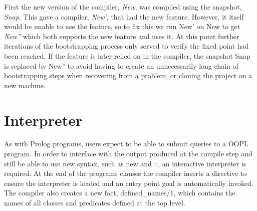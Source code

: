 \documentclass[12pt,a4paper,twoside,openright]{report}
\newcommand{\tblocktextnm}[4]{
    {#1} \& {#4}   \& {#2} \\
    {}     \&  {#3}   \&      \\
}
\newcommand{\tblockoutline}[1]{
    \draw (#1-1-1.south west) |- (#1-1-3.north east) |- (#1-1-3.south west) |- (#1-2-2.south west) |- (#1-1-1.south west);
}
\newcommand{\wblocktext}[1]{
    {#1} \\
    {}\\
}
\newcommand{\wblockoutline}[1]{
    \draw (#1-1-1.south west) |- (#1-1-1.north east) -- (#1-1-1.south east) -- (#1-2-1.south) -- (#1-1-1.south west);
}
\newcommand{\wsupt}[2]{
	\node(mac#2) at (#2-2-2.south west) [wblock, anchor = mac#2-1-1.north west] {\wblocktext{#1}};
	\wblockoutline{mac#2};
}
\begin{document}
\begin{center}
\end{center}

First the new version of the compiler, \emph{New}, was compiled using the snapshot, \emph{Snap}. This gave a compiler, \emph{New'}, that had the new feature. However, it itself would be unable to use the feature, so to fix this we run New' on New to get \emph{New''} which both supports the new feature and uses it. At this point further iterations of the bootstrapping process only served to verify the fixed point had been reached. If the feature is later relied on in the compiler, the snapshot Snap is replaced by New'' to avoid having to create an unnecessarily long chain of bootstrapping steps when recovering from a problem, or cloning the project on a new machine.

\section{Interpreter}

As with Prolog programs, users expect to be able to submit queries to a OOPL program. In order to interface with the output produced at the compile step and still be able to use new syntax, such as new and ::, an interactive interpreter is required. At the end of the programs clauses the compiler inserts a directive to ensure the interpreter is loaded and an entry point goal is automatically invoked. The compiler also creates a new fact, defined_names/1, which contains the names of all classes and predicates defined at the top level.
\end{document}
